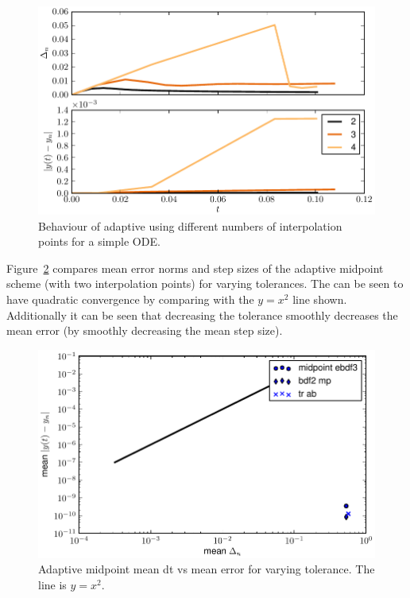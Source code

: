 \begin{figure}[ht!]
  \centering
  \includegraphics{images/mp_ninterp}
  \caption{Behaviour of adaptive \imr using different numbers of interpolation points for a simple ODE.}
  \label{fig:mp-ninterp}
\end{figure}


Figure~\ref{fig:mp-tols} compares mean error norms and step sizes of the adaptive midpoint scheme (with two interpolation points) for varying tolerances.
The \imr can be seen to have quadratic convergence by comparing with the $y=x^2$ line shown.
Additionally it can be seen that decreasing the tolerance smoothly decreases the mean error (by smoothly decreasing the mean step size).

\begin{figure}[ht!]
  \centering
  \includegraphics{images/mp_tols}
  \caption{Adaptive midpoint mean dt vs mean error for varying tolerance. The line is $y = x^2$.}
  \label{fig:mp-tols}
\end{figure}


